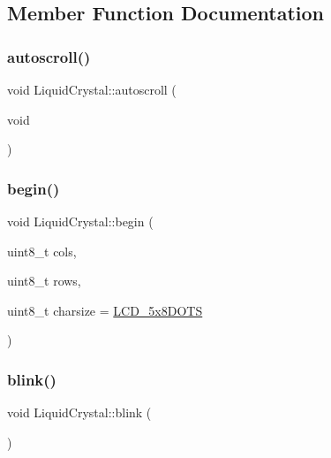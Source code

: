 \subsection{Member Function Documentation}
\mbox{\label{class_liquid_crystal_aa5ac50d6a2053eb1c06abe62614131b4}} 
\subsubsection{\texorpdfstring{autoscroll()}{autoscroll()}}
{\footnotesize\ttfamily void Liquid\+Crystal\+::autoscroll (\begin{DoxyParamCaption}\item[{void}]{ }\end{DoxyParamCaption})}

\mbox{\label{class_liquid_crystal_adb5f37d69809ed7c0772c74a4adff19b}} 
\subsubsection{\texorpdfstring{begin()}{begin()}}
{\footnotesize\ttfamily void Liquid\+Crystal\+::begin (\begin{DoxyParamCaption}\item[{uint8\+\_\+t}]{cols,  }\item[{uint8\+\_\+t}]{rows,  }\item[{uint8\+\_\+t}]{charsize = {\ttfamily \hyperlink{_liquid_crystal_8h_a9ef57e724c1b846dae0f531aff6fb464}{L\+C\+D\+\_\+5x8\+D\+O\+TS}} }\end{DoxyParamCaption})}

\mbox{\label{class_liquid_crystal_a3eadecb726b55a400f08d5e520f9cb9b}} 
\subsubsection{\texorpdfstring{blink()}{blink()}}
{\footnotesize\ttfamily void Liquid\+Crystal\+::blink (\begin{DoxyParamCaption}{ }\end{DoxyParamCaption})}

